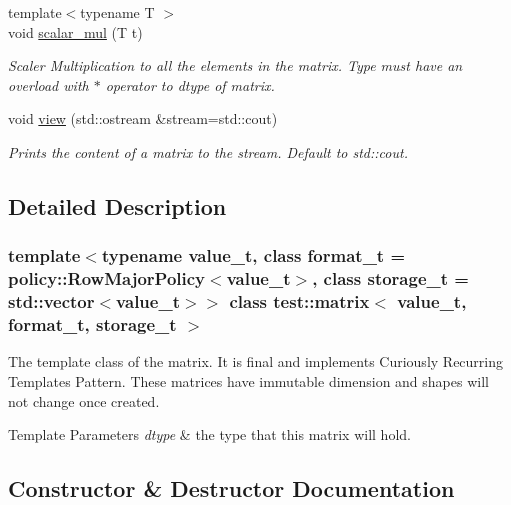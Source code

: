 \begin{DoxyCompactItemize}
{\footnotesize template$<$typename T $>$ }\\void \mbox{\hyperlink{classtest_1_1matrix_a5c36fb88feb075b3302575914d3de483}{scalar\+\_\+mul}} (T t)
\begin{DoxyCompactList}\small\item\em Scaler Multiplication to all the elements in the matrix. Type must have an overload with $\ast$ operator to dtype of matrix. \end{DoxyCompactList}\item 
void \mbox{\hyperlink{classtest_1_1matrix_a854639ce240ca81c977aa7a1cc4be932}{view}} (std\+::ostream \&stream=std\+::cout)
\begin{DoxyCompactList}\small\item\em Prints the content of a matrix to the stream. Default to std\+::cout. \end{DoxyCompactList}\end{DoxyCompactItemize}


\subsection{Detailed Description}
\subsubsection*{template$<$typename value\+\_\+t, class format\+\_\+t = policy\+::\+Row\+Major\+Policy$<$value\+\_\+t$>$, class storage\+\_\+t = std\+::vector$<$value\+\_\+t$>$$>$\newline
class test\+::matrix$<$ value\+\_\+t, format\+\_\+t, storage\+\_\+t $>$}

The template class of the matrix. It is final and implements Curiously Recurring Templates Pattern. These matrices have immutable dimension and shapes will not change once created. 


\begin{DoxyTemplParams}{Template Parameters}
{\em dtype} & the type that this matrix will hold. \\
\hline
\end{DoxyTemplParams}


\subsection{Constructor \& Destructor Documentation}
\mbox{\label{classtest_1_1matrix_a1180d3216a2862c1352abc179ecb9e70}} 
